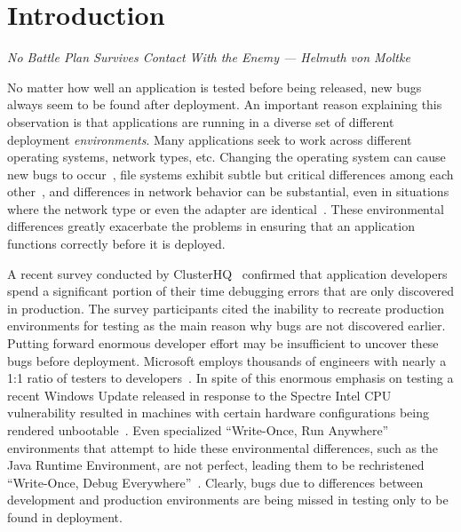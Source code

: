 \section{Introduction}
\label{SEC:introduction}
\textit{No Battle Plan Survives Contact With the Enemy --- Helmuth von Moltke}

No matter how well an application is tested before being released, new bugs
always seem to be found after deployment. An important reason explaining
this observation is that applications are running in a diverse set of
different deployment \emph{environments}. Many applications seek to work
across different operating systems, network types, etc.  Changing the
operating system can cause new bugs to occur~\cite{LinuxGlibcChanges}, file
systems exhibit subtle but critical differences among each
other~\cite{EXT4Layout, AppleHFS}, and differences in network behavior can
be substantial, even in situations where the network type or even the
adapter are identical~\cite{vbox}. These environmental differences greatly
exacerbate the problems in ensuring that an application functions correctly
before it is deployed.

A recent survey conducted by ClusterHQ~\cite{ClusterHQSurvey} confirmed
that application developers spend a significant portion of their time
debugging errors that are only discovered in production.  The survey
participants cited the inability to recreate production environments for
testing as the main reason why bugs are not discovered earlier.  Putting
forward enormous developer effort may be insufficient to uncover these bugs
before deployment.  Microsoft employs thousands of engineers with nearly a
1:1 ratio of testers to developers~\cite{Page2009}.  In spite of this
enormous emphasis on testing a recent Windows Update released in response
to the Spectre Intel CPU vulnerability resulted in machines with certain
hardware configurations being rendered unbootable~\cite{kb4056892}.  Even
specialized ``Write-Once, Run Anywhere'' environments that attempt to hide
these environmental differences, such as the Java Runtime Environment, are
not perfect, leading them to be rechristened ``Write-Once, Debug
Everywhere''~\cite{WODE}.  Clearly, bugs due to differences between
development and production environments are being missed in testing only to
be found in deployment.

